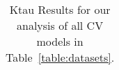 \begin{table}[t]
\begin{center}
\begin{tabular}{|c|c|c|c|c|c|}
\hline
\end{tabular}
\vspace{-5mm}
\end{center}
\caption{Ktau Results for our analysis of all CV models in Table~\ref{table:datasets}. }
\label{table:Ktauresults}
\end{table}

